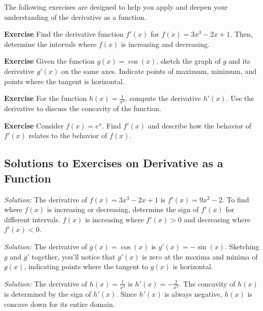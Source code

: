 \documentclass[a4paper,12pt]{book}
\newenvironment{exercise}[1][]
  {\par\medskip\noindent\textbf{Exercise #1} \rmfamily}
  {\medskip}
\newenvironment{solution}[1][]
{\par\noindent\textit{Solution:} \rmfamily}{\medskip}
\begin{document}
The following exercises are designed to help you apply and deepen your understanding of the derivative as a function.

\begin{exercise}
Find the derivative function \( f'(x) \) for \( f(x) = 3x^3 - 2x + 1 \). Then, determine the intervals where \( f(x) \) is increasing and decreasing.
\end{exercise}

\begin{exercise}
Given the function \( g(x) = \cos(x) \), sketch the graph of \( g \) and its derivative \( g'(x) \) on the same axes. Indicate points of maximum, minimum, and points where the tangent is horizontal.
\end{exercise}

\begin{exercise}
For the function \( h(x) = \frac{1}{x^2} \), compute the derivative \( h'(x) \). Use the derivative to discuss the concavity of the function.
\end{exercise}

\begin{exercise}
Consider \( f(x) = e^x \). Find \( f'(x) \) and describe how the behavior of \( f'(x) \) relates to the behavior of \( f(x) \).
\end{exercise}

\subsection{Solutions to Exercises on Derivative as a Function}

\begin{solution}[to Exercise 1]
The derivative of \( f(x) = 3x^3 - 2x + 1 \) is \( f'(x) = 9x^2 - 2 \). 
To find where \( f(x) \) is increasing or decreasing, determine the sign of \( f'(x) \) for different intervals. \( f(x) \) is increasing where \( f'(x) > 0 \) and decreasing where \( f'(x) < 0 \).
\end{solution}

\begin{solution}[to Exercise 2]
The derivative of \( g(x) = \cos(x) \) is \( g'(x) = -\sin(x) \). Sketching \( g \) and \( g' \) together, you'll notice that \( g'(x) \) is zero at the maxima and minima of \( g(x) \), indicating points where the tangent to \( g(x) \) is horizontal.
\end{solution}

\begin{solution}[to Exercise 3]
The derivative of \( h(x) = \frac{1}{x^2} \) is \( h'(x) = -\frac{2}{x^3} \). The concavity of \( h(x) \) is determined by the sign of \( h'(x) \). Since \( h'(x) \) is always negative, \( h(x) \) is concave down for its entire domain.
\end{solution}
\end{document}
